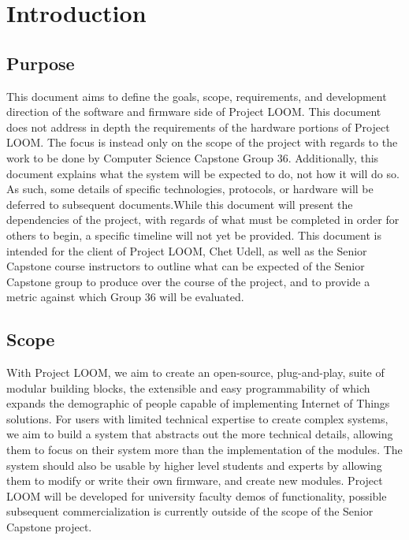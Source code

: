\documentclass[onecolumn, draftclsnofoot,10pt, compsoc]{IEEEtran}
\begin{document}
\section{Introduction}
	\subsection{Purpose}
	This document aims to define the goals, scope, requirements, and development direction of the software and firmware side of Project LOOM. This document does not address in depth the requirements of the hardware portions of Project LOOM. The focus is instead only on the scope of the project with regards to the work to be done by Computer Science Capstone Group 36. Additionally, this document explains what the system will be expected to do, not how it will do so. As such, some details of specific technologies, protocols, or hardware will be deferred to subsequent documents.While this document will present the dependencies of the project, with regards of what must be completed in order for others to begin, a specific timeline will not yet be provided. 
	This document is intended for the client of Project LOOM, Chet Udell, as well as the Senior Capstone course instructors to outline what can be expected of the Senior Capstone group to produce over the course of the project, and to provide a metric against which Group 36 will be evaluated.

	\subsection{Scope}
	With Project LOOM, we aim to create an open-source, plug-and-play, suite of modular building blocks, the extensible and easy programmability of which expands the demographic of people capable of implementing Internet of Things solutions. For users with limited technical expertise to create complex systems, we aim to build a system that abstracts out the more technical details, allowing them to focus on their system more than the implementation of the modules. The system should also be usable by higher level students and experts by allowing them to modify or write their own firmware, and create new modules. Project LOOM will be developed for university faculty demos of functionality, possible subsequent commercialization is currently outside of the scope of the Senior Capstone project.
\end{document}
